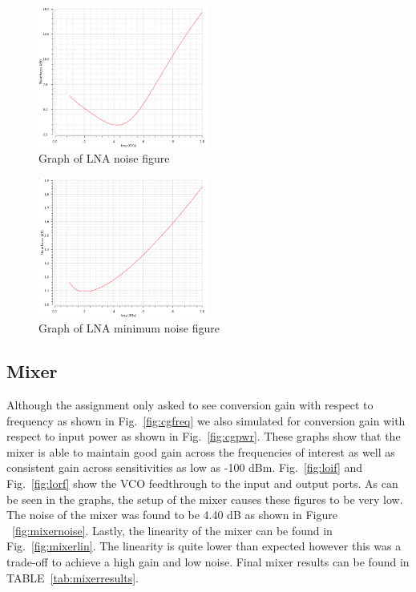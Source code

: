\begin{figure}[h]
   \centering
    \includegraphics[width=0.5\textwidth]{figures/lnanoise.png}
    \caption{Graph of LNA noise figure}
    \label{fig:lnanoise}
\end{figure}

\begin{figure}[h]
   \centering
    \includegraphics[width=0.5\textwidth]{figures/lnanoisemin.png}
    \caption{Graph of LNA minimum noise figure}
    \label{fig:lnanoisemin}
\end{figure}

\subsection{Mixer}
Although the assignment only asked to see conversion gain with respect to frequency as shown in Fig.~\ref{fig:cgfreq} we also simulated for conversion gain with respect to input power as shown in Fig.~\ref{fig:cgpwr}. These graphs show that the mixer is able to maintain good gain across the frequencies of interest as well as consistent gain across sensitivities as low as -100 dBm. Fig.~\ref{fig:loif} and Fig.~\ref{fig:lorf} show the VCO feedthrough to the input and output ports. As can be seen in the graphs, the setup of the mixer causes these figures to be very low. The noise of the mixer was found to be 4.40 dB as shown in Figure ~\ref{fig:mixernoise}. Lastly, the linearity of the mixer can be found in Fig.~\ref{fig:mixerlin}. The linearity is quite lower than expected however this was a trade-off to achieve a high gain and low noise. Final mixer results can be found in TABLE~\ref{tab:mixerresults}.

